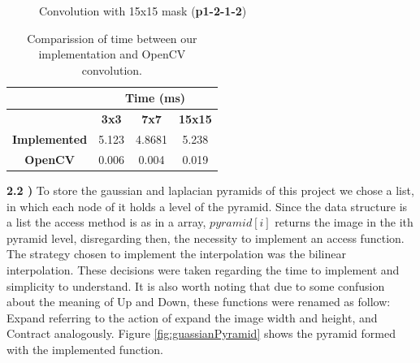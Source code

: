 \documentclass[12pt,a4paper]{article}
\begin{document}
\begin{figure}[!h]
	\centering
	{%
		\setlength{\fboxsep}{1pt}%
		\setlength{\fboxrule}{1pt}%
	}%
	\caption{Convolution with 15x15 mask (\textbf{p1-2-1-2})}
	\label{fig:p1-2-1-2}
\end{figure}

\begin{table}[!h]
 \centering
 \begin{tabular}{|c|c|c|c|}
	\hline
		& \multicolumn{3}{c|}{\textbf{Time (ms)}} \\ \hline
		\backslashbox{\textbf{Convolution}}{\textbf{Mask Size}}    & \textbf{3x3}         & \textbf{7x7}          & \textbf{15x15}      \\ \hline
	\textbf{Implemented}  & 5.123      & 4.8681      & 5.238     \\ \hline
	\textbf{OpenCV} & 0.006      & 0.004       & 0.019     \\ \hline
	\end{tabular}
 \caption{Comparission of time between our implementation and OpenCV convolution.}
 \label{table:convolution-opencv}
 \end{table}

\textbf{2.2 )} To store the gaussian and laplacian pyramids of this project we chose a list, in which each node of it holds a level of the pyramid. Since the data structure is a list the access method is as in a array, $pyramid[i]$ returns the image in the ith pyramid level, disregarding then, the necessity to implement an access function. The strategy chosen to implement the interpolation was the bilinear interpolation. These decisions were taken regarding the time to implement and simplicity to understand. It is also worth noting that due to some confusion about the meaning of Up and Down, these functions were renamed as follow: Expand referring to the action of expand the image width and height, and Contract analogously. Figure \ref{fig:guassianPyramid} shows the pyramid formed with the implemented function. \\
\end{document}
